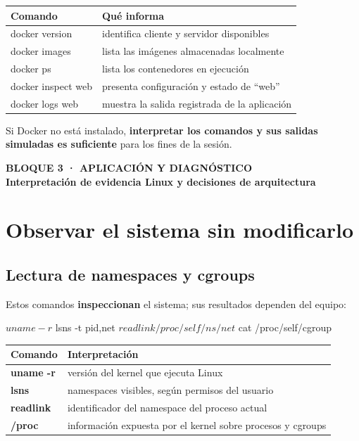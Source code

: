 \documentclass[11pt,a4paper]{article}
\newcommand{\bloque}[2]{%
  \vspace{1.2em}
  \begin{tcolorbox}[enhanced, colback=azulprof, colframe=azulprof, arc=3pt,
      left=12pt,right=12pt,top=9pt,bottom=9pt]
    {\color{white!75!azulmedio}\footnotesize\bfseries\MakeUppercase{#1}}\\[2pt]
    {\color{white}\large\bfseries #2}
  \end{tcolorbox}
  \vspace{0.2em}}
\begin{document}
\begin{center}
\renewcommand{\arraystretch}{1.3}
\begin{tabularx}{\textwidth}{@{}>{\ttfamily}l >{\raggedright\arraybackslash}X@{}}
\toprule
\textbf{\normalfont\color{azulprof} Comando} & \textbf{\color{azulprof} Qué informa} \\
\midrule
docker version      & identifica cliente y servidor disponibles \\
docker images       & lista las imágenes almacenadas localmente \\
docker ps           & lista los contenedores en ejecución \\
docker inspect web  & presenta configuración y estado de \textquotedblleft web\textquotedblright \\
docker logs web     & muestra la salida registrada de la aplicación \\
\bottomrule
\end{tabularx}
\end{center}

Si Docker no está instalado, \textbf{interpretar los comandos y sus salidas simuladas es
suficiente} para los fines de la sesión.

\bloque{Bloque 3 · Aplicación y diagnóstico}{Interpretación de evidencia Linux y decisiones de arquitectura}

\section{Observar el sistema sin modificarlo}

\subsection{Lectura de namespaces y cgroups}

Estos comandos \textbf{inspeccionan} el sistema; sus resultados dependen del equipo:

\begin{codigo}
$ uname -r
$ lsns -t pid,net
$ readlink /proc/self/ns/net
$ cat /proc/self/cgroup
\end{codigo}

\begin{center}
\renewcommand{\arraystretch}{1.3}
\begin{tabularx}{\textwidth}{@{}>{\ttfamily\bfseries}l >{\raggedright\arraybackslash}X@{}}
\toprule
\textbf{\normalfont\color{azulprof} Comando} & \textbf{\color{azulprof} Interpretación} \\
\midrule
uname -r  & versión del kernel que ejecuta Linux \\
lsns      & namespaces visibles, según permisos del usuario \\
readlink  & identificador del namespace del proceso actual \\
/proc     & información expuesta por el kernel sobre procesos y cgroups \\
\bottomrule
\end{tabularx}
\end{center}
\end{document}
